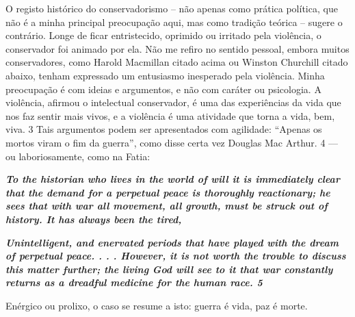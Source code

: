 \par
 
O registo histórico do conservadorismo – não apenas como prática política, que não é a minha principal preocupação aqui, mas como tradição teórica – sugere o contrário. Longe de ficar entristecido, oprimido ou irritado pela violência, o conservador foi animado por ela. Não me refiro no sentido pessoal, embora muitos conservadores, como Harold Macmillan citado acima ou Winston Churchill citado abaixo, tenham expressado um entusiasmo inesperado pela violência. Minha preocupação é com ideias e argumentos, e não com caráter ou psicologia. A violência, afirmou o intelectual conservador, é uma das experiências da vida que nos faz sentir mais vivos, e a violência é uma atividade que torna a vida, bem, viva.
 {\color{blue} 3}  
Tais argumentos podem ser apresentados com agilidade: “Apenas os mortos viram o fim da guerra”, como disse certa vez Douglas Mac Arthur.
 {\color{blue} 4}  
— ou laboriosamente, como na Fatia:
 
\par
 

 \textbf{\textit{To the historian who lives in the world of will it is immediately clear that the demand for a perpetual peace is thoroughly reactionary; he sees that with war all movement, all growth, must be struck out of history. It has always been the tired,} }  
 
 
\par
 

 
\par
 

 \textbf{\textit{Unintelligent, and enervated periods that have played with the dream of perpetual peace. . . . However, it is not worth the trouble to discuss this matter further; the living God will see to it that war constantly returns as a dreadful medicine for the human race. {{\color{blue} 5} } } }  
 
 
\par
 
Enérgico ou prolixo, o caso se resume a isto: guerra é vida, paz é morte.
 
\par
 
